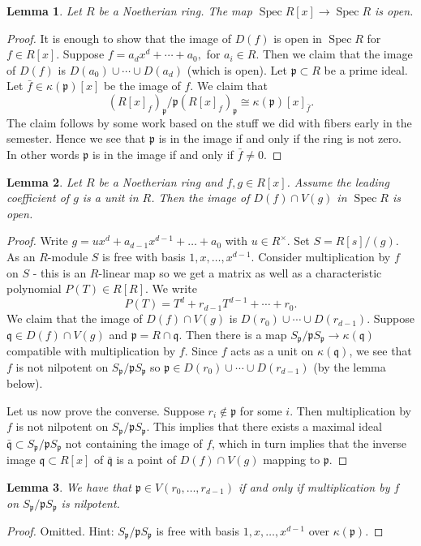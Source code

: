 \documentclass{article}
\newcommand{\fr}{\mathfrak}
\DeclareMathOperator{\Spec}{Spec}
\theoremstyle{plain}
\newtheorem*{lem*}{Lemma}
\theoremstyle{definition}
\theoremstyle{remark}
\begin{document}
\begin{lem*}
Let $R$ be a Noetherian ring. The map $\Spec R[x]\to\Spec R$ is open.
\end{lem*}
\begin{proof}
It is enough to show that the image of $D(f)$ is open in $\Spec R$ for $f\in R[x]$. Suppose $f=a_dx^d+\cdots+a_0,$ for $a_i\in R$. Then we claim that the image of $D(f)$ is $D(a_0)\cup\cdots\cup D(a_d)$ (which is open). Let $\fr p\subset R$ be a prime ideal. Let $\bar f\in\kappa(\fr p)[x]$ be the image of $f$. We claim that
\[(R[x]_f)_{\fr p}/\fr p(R[x]_f)_{\fr p}\cong \kappa(\fr p)[x]_{\bar f}.\]
The claim follows by some work based on the stuff we did with fibers early in the semester. Hence we see that $\fr p$ is in the image if and only if the ring is not zero. In other words $\fr p$ is in the image if and only if $\bar f\neq 0$.
\end{proof}

\begin{lem*}
Let $R$ be a Noetherian ring and $f,g\in R[x]$. Assume the leading coefficient of $g$ is a unit in $R$. Then the image of $D(f)\cap V(g)$ in $\Spec R$ is open.
\end{lem*}
\begin{proof}
Write $g=ux^d+a_{d-1}x^{d-1}+\ldots+a_0$ with $u\in R^\times$. Set $S=R[s]/(g)$. As an $R$-module $S$ is free with basis $1,x,\ldots, x^{d-1}$. Consider multiplication by $f$ on $S$ - this is an $R$-linear map so we get a matrix as well as a characteristic polynomial $P(T)\in R[R]$. We write
\[P(T)=T^d+r_{d-1}T^{d-1}+\cdots+r_0.\]
We claim that the image of $D(f)\cap V(g)$ is $D(r_0)\cup\cdots\cup D(r_{d-1}).$
Suppose $\fr q\in D(f)\cap V(g)$ and $\fr p=R\cap\fr q$. Then there is a map $S_\fr p/\fr pS_\fr p\to\kappa(\fr q)$ compatible with multiplication by $f$. Since $f$ acts as a unit on $\kappa(\fr q)$, we see that $f$ is not nilpotent on $S_\fr p/\fr pS_\fr p$ so $\fr p\in D(r_0)\cup\cdots\cup D(r_{d-1})$ (by the lemma below).

Let us now prove the converse. Suppose $r_i\notin \fr p$ for some $i$. Then multiplication by $f$ is not nilpotent on $S_\fr p/\fr pS_\fr p$. This implies that there exists a maximal ideal $\bar{\fr q}\subset S_\fr p/\fr pS_\fr p$ not containing the image of $f$, which in turn implies that the inverse image $\fr q\subset R[x]$ of $\bar{\fr q}$ is a point of $D(f)\cap V(g)$ mapping to $\fr p$.
\end{proof}

\begin{lem*}
We have that $\fr p\in V(r_0,\ldots, r_{d-1})$ if and only if multiplication by $f$ on $S_\fr p/\fr pS_\fr p$ is nilpotent.
\end{lem*}
\begin{proof}
Omitted. Hint: $S_\fr p/\fr pS_\fr p$ is free with basis $1,x,\ldots,x^{d-1}$ over $\kappa(\fr p)$.
\end{proof}
\end{document}
